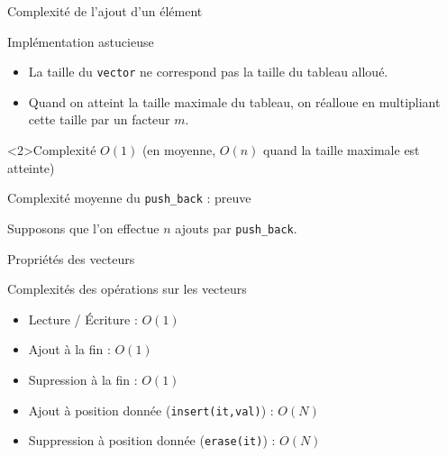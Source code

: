 \begin{frame}{Complexité de l'ajout d'un élément}
 \begin{block}{Implémentation astucieuse}
 \begin{itemize}
     \item La taille du \texttt{vector} ne correspond pas la taille du tableau alloué.
    \item Quand on atteint la taille maximale du tableau, on réalloue en multipliant cette taille par un facteur $m$.
 \end{itemize}
 \end{block}

 \begin{exampleblock}<2>{Complexité}
     \centering
     $O(1)$ (en moyenne, $O(n)$ quand la taille maximale est atteinte)
 \end{exampleblock}
\end{frame}


\begin{frame}{Complexité moyenne du \texttt{push\_back} : preuve}
 
Supposons que l'on effectue $n$ ajouts par \texttt{push_back}.
 
\end{frame}

\begin{frame}{Propriétés des vecteurs}
    \begin{block}{Complexités des opérations sur les vecteurs}
  \begin{itemize}
  \item Lecture / Écriture : $O(1)$
  \item Ajout à la fin : $O(1)$
  \item Supression à la fin : $O(1)$
  \item Ajout à position donnée (\texttt{insert(it,val)}) : $O(N)$
  \item Suppression à position donnée (\texttt{erase(it)}) : $O(N)$
  \end{itemize}
\end{block}
\end{frame}

